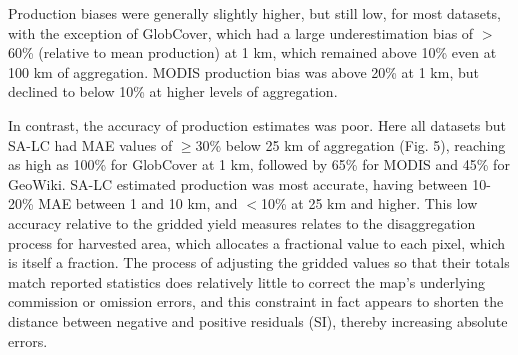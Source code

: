 \documentclass{pnastwo}
\begin{document}
\begin{article}
Production biases were generally slightly higher, but still low, for most datasets, with the exception of GlobCover, which had a large underestimation bias of $>$60\% (relative to mean production) at 1 km, which remained above 10\% even at 100 km of aggregation. MODIS production bias was above 20\% at 1 km, but declined to below 10\% at higher levels of aggregation.  

In contrast, the accuracy of production estimates was poor. Here all datasets but SA-LC had MAE values of $\geq$30\% below 25 km of aggregation (Fig. 5), reaching as high as 100\% for GlobCover at 1 km, followed by 65\% for MODIS and 45\% for GeoWiki. SA-LC estimated production was most accurate, having between 10-20\% MAE between 1 and 10 km, and $<$10\% at 25 km and higher.  This low accuracy relative to the gridded yield measures relates to the disaggregation process for harvested area, which allocates a fractional value to each pixel, which is itself a fraction. The process of adjusting the gridded values so that their totals match reported statistics does relatively little to correct the map's underlying commission or omission errors, and this constraint in fact appears to shorten the distance between negative and positive residuals (SI), thereby increasing absolute errors.  


\end{article}
\end{document}
